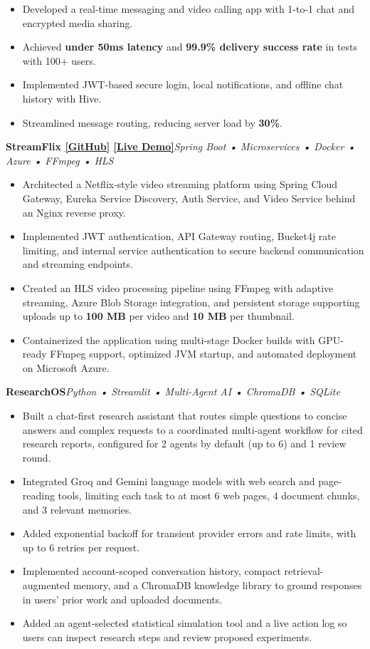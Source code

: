 \documentclass[12pt]{article}
\newcommand{\resumeItem}[1]{\item\small #1}
\newcommand{\resumeProjectHeading}[2]{
\textbf{#1}\hfill\textit{#2}
}
\begin{document}
\begin{itemize}
\resumeItem{Developed a real-time messaging and video calling app with 1-to-1 chat and encrypted media sharing.}
\resumeItem{Achieved \textbf{under 50ms latency} and \textbf{99.9\% delivery success rate} in tests with 100+ users.}
\resumeItem{Implemented JWT-based secure login, local notifications, and offline chat history with Hive.}
\resumeItem{Streamlined message routing, reducing server load by \textbf{30\%}.}
\end{itemize}

\resumeProjectHeading
{StreamFlix \hspace{4pt}
\href{https://github.com/sauravchauhan2003/StreamflixBackend}{\underline{[GitHub]}}
\hspace{8pt}
\href{https://streamflix.proudground-086c2f95.centralindia.azurecontainerapps.io/}{\underline{[Live Demo]}}}
{Spring Boot • Microservices • Docker • Azure • FFmpeg • HLS}

\begin{itemize}
\resumeItem{Architected a Netflix-style video streaming platform using Spring Cloud Gateway, Eureka Service Discovery, Auth Service, and Video Service behind an Nginx reverse proxy.}

\resumeItem{Implemented JWT authentication, API Gateway routing, Bucket4j rate limiting, and internal service authentication to secure backend communication and streaming endpoints.}

\resumeItem{Created an HLS video processing pipeline using FFmpeg with adaptive streaming, Azure Blob Storage integration, and persistent storage supporting uploads up to \textbf{100 MB} per video and \textbf{10 MB} per thumbnail.}

\resumeItem{Containerized the application using multi-stage Docker builds with GPU-ready FFmpeg support, optimized JVM startup, and automated deployment on Microsoft Azure.}
\end{itemize}

\resumeProjectHeading
{ResearchOS}
{Python • Streamlit • Multi-Agent AI • ChromaDB • SQLite}

\begin{itemize}
\resumeItem{Built a chat-first research assistant that routes simple questions to concise answers and complex requests to a coordinated multi-agent workflow for cited research reports, configured for 2 agents by default (up to 6) and 1 review round.}
\resumeItem{Integrated Groq and Gemini language models with web search and page-reading tools, limiting each task to at most 6 web pages, 4 document chunks, and 3 relevant memories.}
\resumeItem{Added exponential backoff for transient provider errors and rate limits, with up to 6 retries per request.}
\resumeItem{Implemented account-scoped conversation history, compact retrieval-augmented memory, and a ChromaDB knowledge library to ground responses in users' prior work and uploaded documents.}
\resumeItem{Added an agent-selected statistical simulation tool and a live action log so users can inspect research steps and review proposed experiments.}
\end{itemize}
\end{document}
